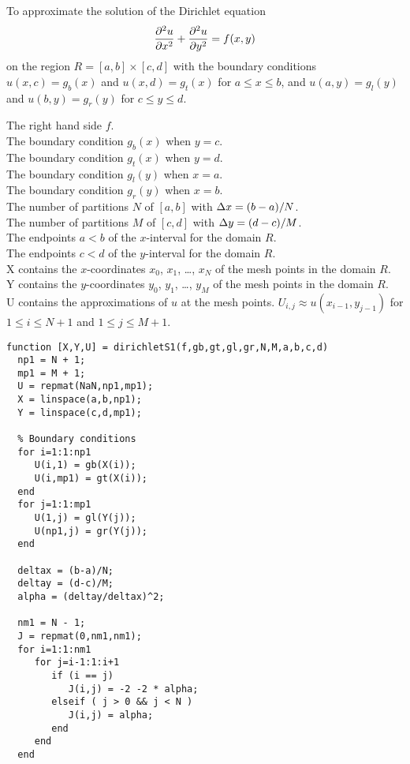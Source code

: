 \begin{code}
To approximate the solution of the Dirichlet equation
\[
  \frac{\partial^{2}{u}}{\partial{x}^{2}} + \frac{\partial^{2}{u}}{\partial{y}^{2}} = f(x,y)
\]
on the region $R = [a,b]\times[c,d]$ with the boundary conditions
$u(x,c) = g_b(x)$ and $u(x,d) = g_t(x)$ for $a \leq x \leq b$, and
$u(a,y) = g_l(y)$ and $u(b,y) = g_r(y)$ for $c \leq y \leq d$.

 The right hand side $f$.\\
The boundary condition $g_b(x)$ when $y = c$.\\
The boundary condition $g_t(x)$ when $y = d$.\\
The boundary condition $g_l(y)$ when $x = a$.\\
The boundary condition $g_r(y)$ when $x = b$.\\
The number of partitions $N$ of $[a,b]$ with $\Delta{x} = (b-a)/N$.\\
The number of partitions $M$ of $[c,d]$ with $\Delta{y} = (d-c)/M$.  \\
The endpoints $a < b$ of the $x$-interval for the domain $R$.\\
The endpoints $c < d$ of the $y$-interval for the domain $R$.\\
X contains the $x$-coordinates $x_0$, $x_1$, \ldots, $x_N$ of the
mesh points in the domain $R$.\\
Y contains the $y$-coordinates $y_0$, $y_1$, \ldots, $y_M$ of the
mesh points in the domain $R$.\\
U contains the approximations of $u$ at the mesh points.
$U_{i,j} \approx u(x_{i-1},y_{j-1})$ for $1\leq i \leq N+1$ and
$1 \leq j \leq M+1$.
\small
\begin{verbatim}
function [X,Y,U] = dirichletS1(f,gb,gt,gl,gr,N,M,a,b,c,d)
  np1 = N + 1;
  mp1 = M + 1;
  U = repmat(NaN,np1,mp1);
  X = linspace(a,b,np1);
  Y = linspace(c,d,mp1);

  % Boundary conditions
  for i=1:1:np1
     U(i,1) = gb(X(i));
     U(i,mp1) = gt(X(i));
  end
  for j=1:1:mp1
     U(1,j) = gl(Y(j));
     U(np1,j) = gr(Y(j));
  end

  deltax = (b-a)/N;
  deltay = (d-c)/M;
  alpha = (deltay/deltax)^2;

  nm1 = N - 1;
  J = repmat(0,nm1,nm1);
  for i=1:1:nm1
     for j=i-1:1:i+1
        if (i == j)
           J(i,j) = -2 -2 * alpha; 
        elseif ( j > 0 && j < N )
           J(i,j) = alpha;
        end
     end
  end


\end{verbatim}
\end{code}
